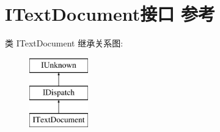 \hypertarget{interface_i_text_document}{}\section{I\+Text\+Document接口 参考}
\label{interface_i_text_document}
类 I\+Text\+Document 继承关系图\+:\begin{figure}[H]
\begin{center}
\leavevmode
\includegraphics[height=3.000000cm]{interface_i_text_document}
\end{center}
\end{figure}
